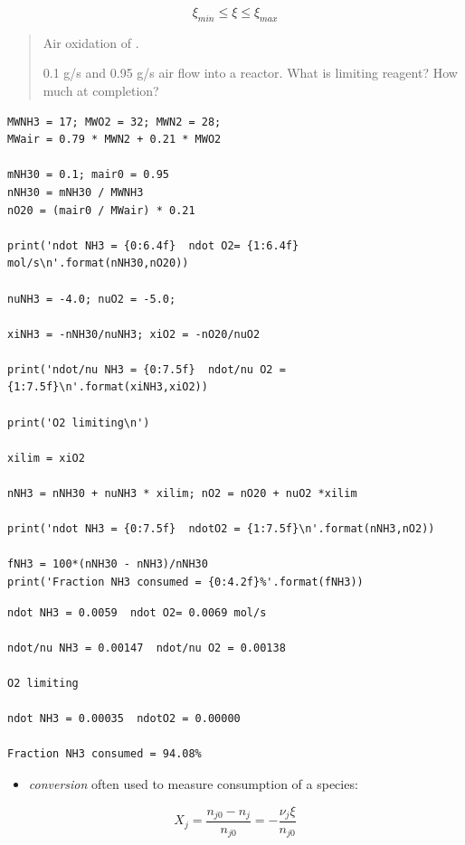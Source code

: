 \documentclass[11pt]{article}
\begin{document}
\begin{equation*}
\xi_{min} \le \xi \le \xi_{max}
\end{equation*}

\begin{quote}
\hline
Air oxidation of .


0.1 g/s  and 0.95 g/s air flow into a reactor.  What is limiting reagent?  How much  at completion?
\hline
\end{quote}

\begin{verbatim}
MWNH3 = 17; MWO2 = 32; MWN2 = 28;
MWair = 0.79 * MWN2 + 0.21 * MWO2

mNH30 = 0.1; mair0 = 0.95
nNH30 = mNH30 / MWNH3
nO20 = (mair0 / MWair) * 0.21

print('ndot NH3 = {0:6.4f}  ndot O2= {1:6.4f} mol/s\n'.format(nNH30,nO20))

nuNH3 = -4.0; nuO2 = -5.0;

xiNH3 = -nNH30/nuNH3; xiO2 = -nO20/nuO2

print('ndot/nu NH3 = {0:7.5f}  ndot/nu O2 = {1:7.5f}\n'.format(xiNH3,xiO2))

print('O2 limiting\n')

xilim = xiO2

nNH3 = nNH30 + nuNH3 * xilim; nO2 = nO20 + nuO2 *xilim

print('ndot NH3 = {0:7.5f}  ndotO2 = {1:7.5f}\n'.format(nNH3,nO2))

fNH3 = 100*(nNH30 - nNH3)/nNH30
print('Fraction NH3 consumed = {0:4.2f}%'.format(fNH3))
\end{verbatim}

\begin{verbatim}
ndot NH3 = 0.0059  ndot O2= 0.0069 mol/s

ndot/nu NH3 = 0.00147  ndot/nu O2 = 0.00138

O2 limiting

ndot NH3 = 0.00035  ndotO2 = 0.00000

Fraction NH3 consumed = 94.08%
\end{verbatim}

\begin{itemize}
\item \emph{conversion} often used to measure consumption of a species:
\end{itemize}

\[X_{j} = \frac{n_{j0}-n_{j}}{n_{j0}} = -\frac{\nu_{j}\xi}{n_{j0}} \]
\end{document}
